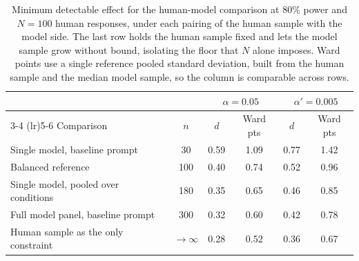 \begin{table}[htb]
  \centering
  \caption{Minimum detectable effect for the human-model comparison at 80\% power and $N = 100$ human responses, under each pairing of the human sample with the model side. The last row holds the human sample fixed and lets the model sample grow without bound, isolating the floor that $N$ alone imposes. Ward points use a single reference pooled standard deviation, built from the human sample and the median model sample, so the column is comparable across rows.}
  \small
  \label{tab:sensitivity_human_designs}
  \begin{tabular}{lccccc}
    \toprule
    & & \multicolumn{2}{c}{$\alpha = 0.05$} & \multicolumn{2}{c}{$\alpha' = 0.005$} \\
    \cmidrule(lr){3-4} \cmidrule(lr){5-6}
    Comparison & $n$ & $d$ & Ward pts & $d$ & Ward pts \\
    \midrule
    Single model, baseline prompt & 30 & 0.59 & 1.09 & 0.77 & 1.42 \\
    Balanced reference & 100 & 0.40 & 0.74 & 0.52 & 0.96 \\
    Single model, pooled over conditions & 180 & 0.35 & 0.65 & 0.46 & 0.85 \\
    Full model panel, baseline prompt & 300 & 0.32 & 0.60 & 0.42 & 0.78 \\
    Human sample as the only constraint & $\to\infty$ & 0.28 & 0.52 & 0.36 & 0.67 \\
    \bottomrule
  \end{tabular}
\end{table}
